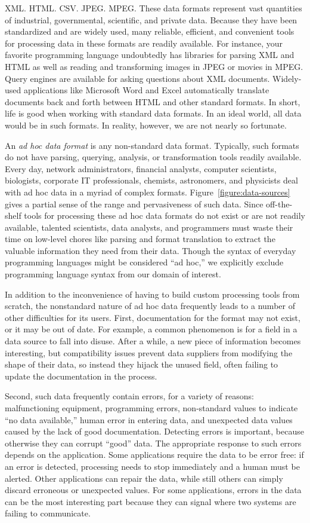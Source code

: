 XML. HTML. CSV. JPEG. MPEG.  These data formats
represent vast quantities of industrial, governmental,
scientific, and private data.  Because they have been standardized
and are widely used, many reliable, efficient, and
convenient tools for processing data in these formats are
readily available.  For instance, your favorite programming language
undoubtedly has libraries for parsing XML and HTML as well as
reading and transforming images in JPEG or movies in MPEG.  Query engines
are available for asking questions about XML documents.
Widely-used applications like Microsoft Word and Excel automatically
translate documents back and forth between HTML and other
standard formats.  In short, life is good when working with standard data formats. In an ideal world, all data would be in such formats. In reality, however, we are not nearly so fortunate.

An {\em ad hoc data format} is any non-standard data format.  
Typically, such formats do not have parsing,
querying, analysis, or transformation tools readily available.
Every day, network administrators, financial analysts, computer
scientists, biologists, corporate IT professionals, chemists, astronomers, and
physicists deal with ad hoc data in a myriad of complex formats.
Figure~\ref{figure:data-sources} gives a partial sense of the range
and pervasiveness of such data.  Since off-the-shelf
tools for processing these ad hoc data formats do not exist
or are not readily available, talented scientists, data analysts, and
programmers must waste their time 
on low-level chores like parsing and format translation
to extract the valuable information they need from their data.
Though the syntax of everyday programming languages
might be considered ``ad hoc,'' we explicitly exclude
programming language syntax from our domain of interest.

In addition to the inconvenience of having to build custom
processing tools from scratch, the nonstandard nature of ad hoc data
frequently leads to a number of other difficulties for its users.
First, documentation for the format may not exist, or it may be out of
date.  For example, a common phenomenon is for a field in a data source to fall
into disuse.  After a while, a new piece of information becomes
interesting, but compatibility issues prevent data suppliers from
modifying the shape of their data, so instead they hijack the unused
field, often failing to update the documentation in the process.

Second, such data frequently contain errors, for a variety of reasons:
malfunctioning equipment, programming errors, non-standard values to
indicate ``no data available,'' human error in entering data, and
unexpected data values caused by the lack of good documentation.
Detecting errors is important, because otherwise they can corrupt
``good'' data.  The appropriate response to such errors depends on the
application. Some applications require the data to be error free: if
an error is detected, processing needs to stop immediately and a human
must be alerted.  Other applications can repair the data, while still
others can simply discard erroneous or unexpected values.  For some
applications, errors in the data can be the most interesting part
because they can signal where two systems are failing to communicate.

